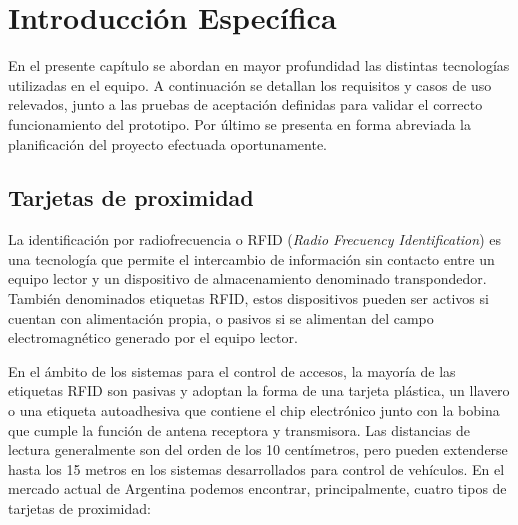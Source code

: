 
\chapter{Introducción Específica}
\label{Chapter2}

En el presente capítulo se abordan en mayor profundidad las distintas tecnologías utilizadas en el equipo. A continuación se detallan los requisitos y casos de uso relevados, junto a las pruebas de aceptación definidas para validar el correcto funcionamiento del prototipo. Por último se presenta en forma abreviada la planificación del proyecto efectuada oportunamente.

\section{Tarjetas de proximidad}
\label{sec:tarjetas}

La identificación por radiofrecuencia o RFID (\emph{Radio Frecuency Identification}) es una tecnología que permite el intercambio de información sin contacto entre un equipo lector y un dispositivo de almacenamiento denominado transpondedor. También denominados etiquetas RFID, estos dispositivos pueden ser activos si cuentan con alimentación propia, o pasivos si se alimentan del campo electromagnético generado por el equipo lector. 

En el ámbito de los sistemas para el control de accesos, la mayoría de las etiquetas RFID son pasivas y adoptan la forma de una tarjeta plástica, un llavero o una etiqueta autoadhesiva que contiene el chip electrónico junto con la bobina que cumple la función de antena receptora y transmisora. Las distancias de lectura generalmente son del orden de los 10 centímetros, pero pueden extenderse hasta los 15 metros en los sistemas desarrollados para control de vehículos. En el mercado actual de Argentina podemos encontrar, principalmente, cuatro tipos de tarjetas de proximidad:

